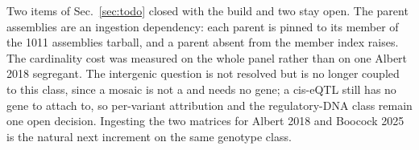Two items of Sec.~\ref{sec:todo} closed with the build and two stay open. The parent
assemblies are an ingestion dependency: each parent is pinned to its member of the 1011
assemblies tarball, and a parent absent from the member index raises. The cardinality
cost was measured on the whole panel rather than on one Albert 2018 segregant. The
intergenic question is not resolved but is no longer coupled to this class, since a
mosaic is not a  and needs no gene; a cis-eQTL still has no gene
to attach to, so per-variant attribution and the regulatory-DNA class remain one open
decision. Ingesting the two matrices for Albert 2018 and Boocock 2025 is the natural next
increment on the same genotype class.
